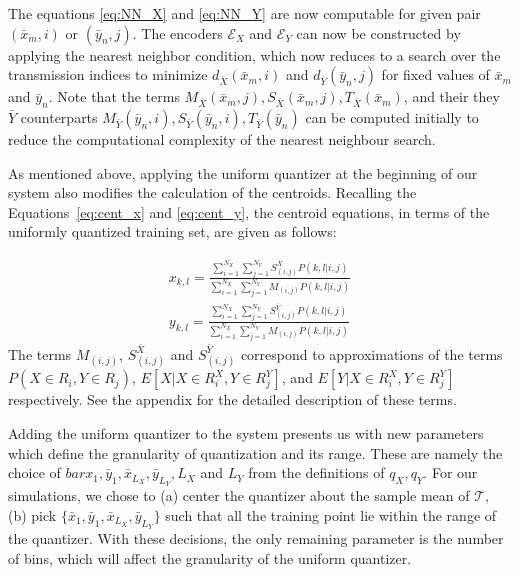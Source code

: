 The equations \eqref{eq:NN_X} and \eqref{eq:NN_Y} are now computable for given pair $(\bar x_m, i)$ or $(\bar y_n, j)$. The encoders $\mathcal{E}_X$ and $\mathcal{E}_Y$ can now be constructed by applying the nearest neighbor condition, which now reduces to a search over the transmission indices to minimize $d_{\bar X}(\bar x_m,i)$ and $d_{\bar Y}(\bar y_n,j)$ for fixed values of $\bar x_m$ and $\bar y_n$. Note that the terms $M_{\bar X}(\bar x_m,j),S_{\bar X}(\bar x_m,j),T_{\bar X}(\bar x_m)$, and their they $\bar Y$ counterparts $M_{\bar Y}(\bar y_n,i),S_{\bar Y}(\bar y_n,i),T_{\bar Y}(\bar y_n)$ can be computed initially to reduce the computational complexity of the nearest neighbour search.

As mentioned above, applying the uniform quantizer at the beginning of our system also modifies the calculation of the centroids. Recalling the Equations~\eqref{eq:cent_x} and \eqref{eq:cent_y}, the centroid equations, in terms of the uniformly quantized training set, are given as follows:

\begin{align}
    \label{eq:C_X}
    x_{k,l} = 
        \frac{\sum_{i=1}^{N_X} \sum_{j=1}^{N_Y}
        S_{(i,j)}^{\bar X} P(k,l|i,j)}
        {\sum_{i=1}^{N_X} \sum_{j=1}^{N_Y}
        M_{(i,j)} P(k,l|i,j)}\\
    \label{eq:C_Y}
    y_{k,l} = 
        \frac{\sum_{i=1}^{N_X} \sum_{j=1}^{N_Y}
        S_{(i,j)}^{\bar Y} P(k,l|i,j)}
        {\sum_{i=1}^{N_X} \sum_{j=1}^{N_Y}
        M_{(i,j)} P(k,l|i,j)}
\end{align}
The terms $M_{(i,j)}$, $S_{(i,j)}^{\bar X}$ and $S_{(i,j)}^{\bar Y}$ correspond to approximations of the terms $P(X \in R_i, Y \in R_j)$, $E[X|X \in R_i^X, Y \in R_j^Y]$, and $E[Y|X \in R_i^X, Y \in R_j^Y]$ respectively. See the appendix for the detailed description of these terms.

Adding the uniform quantizer to the system presents us with new parameters which define the granularity of quantization and its range. These are namely the choice of $bar x_1, \bar y_1, \bar x_{L_X}, \bar y_{L_Y}, L_X$ and $L_Y$ from the definitions of $q_X,q_Y$. For our simulations, we chose to (a) center the quantizer about the sample mean of $\mathcal T$, (b) pick $\{\bar x_1, \bar y_1, \bar x_{L_X}, \bar y_{L_Y}\}$ such that all the training point lie within the range of the quantizer. With these decisions, the only remaining parameter is the number of bins, which will affect the granularity of the uniform quantizer.

